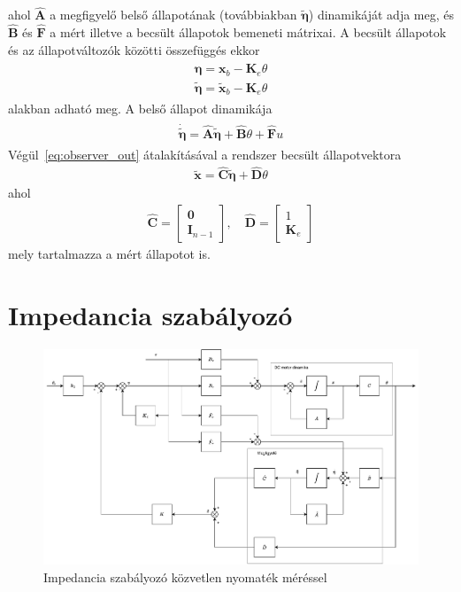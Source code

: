 ahol $\hat{\bm A}$ a megfigyelő belső állapotának (továbbiakban $\tilde{\bm \eta}$) 
dinamikáját adja meg, és $\hat{\bm B}$ és $\hat{\bm F}$ a mért illetve a becsült állapotok 
bemeneti mátrixai. A becsült állapotok és az állapotváltozók közötti összefüggés ekkor
\begin{align}
    \begin{split}
    \bm \eta = \bm x_b - \bm K_e \theta \\
    \tilde{\bm \eta} = \tilde{\bm x}_b - \bm K_e \theta
    \end{split}
\end{align}
alakban adható meg. A belső állapot dinamikája
\begin{align}
    \begin{split}
    \dot{\tilde{\bm \eta}} = \hat{\bm A} \tilde{\bm \eta} + \hat{\bm B} \theta + \hat{\bm F} u
    \end{split}
\end{align}
Végül~\ref{eq:observer_out} átalakításával a rendszer becsült állapotvektora
\begin{align}
    \tilde{\bm x} = \hat{\bm C} \tilde{\bm \eta} + \hat{\bm D} \theta
\end{align}
ahol
\begin{align}
    \hat{\bm C} = 
    \begin{bmatrix}
        \bm 0 \\
        \bm I_{n-1}
    \end{bmatrix},
    \quad
    \hat{\bm D} = 
    \begin{bmatrix}
        1 \\
        \bm K_e
    \end{bmatrix}
\end{align}
mely tartalmazza a mért állapotot is.

\section{Impedancia szabályozó}


\begin{figure}[ht]
\begin{center}
\includegraphics[width=\textwidth]{images/compensated_position_control_torque.drawio.pdf}
\caption{Impedancia szabályozó közvetlen nyomaték méréssel}
\end{center}
\end{figure}

